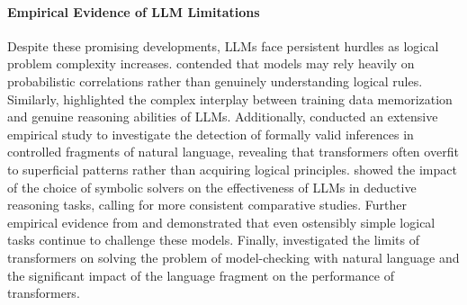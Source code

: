 
\paragraph{Empirical Evidence of LLM Limitations}

Despite these promising developments, LLMs face persistent hurdles as logical problem complexity increases. \citet{Yan2024DoLL} contended that models may rely heavily on probabilistic correlations rather than genuinely understanding logical rules. Similarly, \citet{Xie2024OnMO} highlighted the complex interplay  between training data memorization and genuine reasoning abilities of LLMs. Additionally, \citet{Schlegel2022CanTR} conducted an extensive empirical study to investigate the detection of formally valid inferences in controlled fragments of natural language, revealing that transformers often overfit to superficial patterns rather than acquiring logical principles. \citet{Lam2024ACL} showed the impact of the choice of symbolic solvers on the effectiveness of LLMs in deductive reasoning tasks, calling for more consistent comparative studies. Further empirical evidence from \citet{Dziri2023FaithAF} and \citet{Parmar2024LogicBenchTS} demonstrated that even ostensibly simple logical tasks continue to challenge these models. Finally, \citet{madusanka-etal-2023-identifying} investigated the limits of transformers on solving the problem of model-checking with natural language and the significant impact of the language fragment on the performance of transformers.



